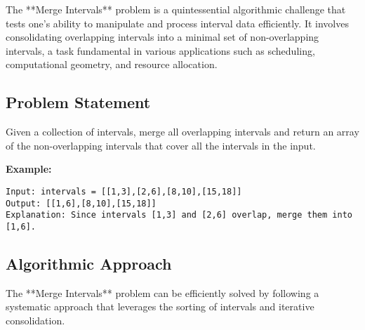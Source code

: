 
\label{problem:MergeIntervals}

The **Merge Intervals** problem is a quintessential algorithmic challenge that tests one's ability to manipulate and process interval data efficiently. It involves consolidating overlapping intervals into a minimal set of non-overlapping intervals, a task fundamental in various applications such as scheduling, computational geometry, and resource allocation.

\subsection*{Problem Statement}
Given a collection of intervals, merge all overlapping intervals and return an array of the non-overlapping intervals that cover all the intervals in the input.

\textbf{Example:}

\begin{verbatim}
Input: intervals = [[1,3],[2,6],[8,10],[15,18]]
Output: [[1,6],[8,10],[15,18]]
Explanation: Since intervals [1,3] and [2,6] overlap, merge them into [1,6].
\end{verbatim}


\subsection*{Algorithmic Approach}
The **Merge Intervals** problem can be efficiently solved by following a systematic approach that leverages the sorting of intervals and iterative consolidation.

